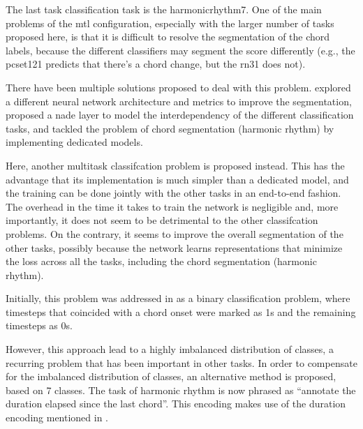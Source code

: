 
The last task classification task is the
\gls{harmonicrhythm7}. One of the main problems of the
\gls{mtl} configuration, especially with the larger number
of tasks proposed here, is that it is difficult to resolve
the segmentation of the chord labels, because the different
classifiers may segment the score differently (e.g., the
\gls{pcset121} predicts that there's a chord change, but the
\gls{rn31} does not).

There have been multiple solutions proposed to deal with
this problem. \textcite{chen2021attend} explored a different
neural network architecture and metrics to improve the
segmentation, \textcite{micchi2021deep} proposed a
\gls{nade} layer to model the interdependency of the
different classification tasks, \textcite{mcleod2021modular}
and  \textcite{wu2021melody} tackled the problem of chord
segmentation (harmonic rhythm) by implementing dedicated
models. 

Here, another multitask classifcation problem is proposed
instead. This has the advantage that its implementation is
much simpler than a dedicated model, and the training can be
done jointly with the other tasks in an end-to-end fashion.
The overhead in the time it takes to train the network is
negligible and, more importantly, it does not seem to be
detrimental to the other classifcation problems. On the
contrary, it seems to improve the overall segmentation of
the other tasks, possibly because the network learns
representations that minimize the loss across all the tasks,
including the chord segmentation (harmonic rhythm).

Initially, this problem was addressed in
\textcite{napoleslopez2021augmentednet} as a binary
classification problem, where timesteps that coincided with
a chord onset were marked as 1s and the remaining timesteps
as 0s.

However, this approach lead to a highly imbalanced
distribution of classes, a recurring problem that has been
important in other tasks. In order to compensate for the
imbalanced distribution of classes, an alternative method is
proposed, based on 7 classes. The task of harmonic rhythm is
now phrased as ``annotate the duration elapsed since the
last chord''. This encoding makes use of the duration
encoding mentioned in
.
